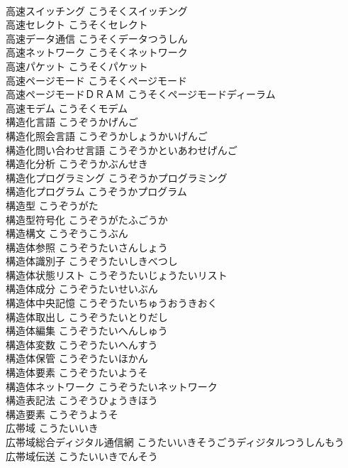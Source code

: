 \documentclass[8pt]{extreport}
\begin{document}
\begin{CJK}{UTF8}{min}
\\	高速スイッチング	こうそくスイッチング	
\\	高速セレクト	こうそくセレクト	
\\	高速データ通信	こうそくデータつうしん	
\\	高速ネットワーク	こうそくネットワーク	
\\	高速パケット	こうそくパケット	
\\	高速ページモード	こうそくページモード	
\\	高速ページモードＤＲＡＭ	こうそくページモードディーラム	
\\	高速モデム	こうそくモデム	
\\	構造化言語	こうぞうかげんご	
\\	構造化照会言語	こうぞうかしょうかいげんご	
\\	構造化問い合わせ言語	こうぞうかといあわせげんご	
\\	構造化分析	こうぞうかぶんせき	
\\	構造化プログラミング	こうぞうかプログラミング	
\\	構造化プログラム	こうぞうかプログラム	
\\	構造型	こうぞうがた	
\\	構造型符号化	こうぞうがたふごうか	
\\	構造構文	こうぞうこうぶん	
\\	構造体参照	こうぞうたいさんしょう	
\\	構造体識別子	こうぞうたいしきべつし	
\\	構造体状態リスト	こうぞうたいじょうたいリスト	
\\	構造体成分	こうぞうたいせいぶん	
\\	構造体中央記憶	こうぞうたいちゅうおうきおく	
\\	構造体取出し	こうぞうたいとりだし	
\\	構造体編集	こうぞうたいへんしゅう	
\\	構造体変数	こうぞうたいへんすう	
\\	構造体保管	こうぞうたいほかん	
\\	構造体要素	こうぞうたいようそ	
\\	構造体ネットワーク	こうぞうたいネットワーク	
\\	構造表記法	こうぞうひょうきほう	
\\	構造要素	こうぞうようそ	
\\	広帯域	こうたいいき	
\\	広帯域総合ディジタル通信網	こうたいいきそうごうディジタルつうしんもう	
\\	広帯域伝送	こうたいいきでんそう	

\end{CJK}
\end{document}
